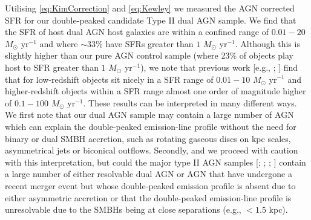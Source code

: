 Utilising \ref{eq:KimCorrection} and \ref{eq:Kewley} we measured the AGN corrected SFR for our double-peaked candidate Type II dual AGN sample. We find that the SFR of host dual AGN host galaxies are within a confined range of $0.01-20$ $M_{\odot}$ yr$^{-1}$ and where $\sim${33\%} have SFRs greater than $1$ $M_{\odot}$ yr$^{-1}$. Although this is slightly higher than our pure AGN control sample (where 23\% of objects play host to SFR greater than $1$ $M_{\odot}$ yr$^{-1}$), we note that previous work [e.g., \cite{Kauffmann_2003}; \cite{Silverman_2009}] find that for low-redshift objects sit nicely in a SFR range of $0.01-10$ $M_{\odot}$ yr$^{-1}$ and higher-redshift objects within a SFR range almost one order of magnitude higher of $0.1-100$ $M_{\odot}$ yr$^{-1}$. These results can be interpreted in many different ways. We first note that our dual AGN sample may contain a large number of AGN which can explain the double-peaked emission-line profile without the need for binary or dual SMBH accretion, such as rotating gaseous discs on kpc scales, asymmetrical jets or biconical outflows. Secondly, and we proceed with caution with this interpretation, but could the major type II AGN samples [\cite{Kauffmann_2003}; \cite{Zakamska_2006}; \cite{Gu_2006}; \cite{Silverman_2009}] contain a large number of either resolvable dual AGN or AGN that have undergone a recent merger event but whose double-peaked emission profile is absent due to either asymmetric accretion or that the double-peaked emission-line profile is unresolvable due to the SMBHs being at close separations (e.g., $<{1.5}$ kpc).  

